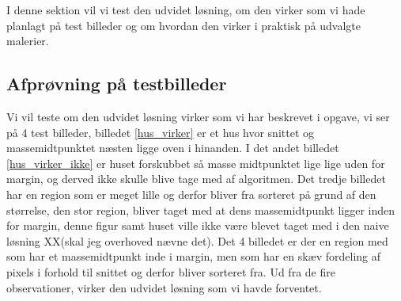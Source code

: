 I denne sektion vil vi test den udvidet løsning, om den virker som vi
hade planlagt på test billeder og om hvordan den virker i praktisk på
udvalgte malerier.

\subsection{Afprøvning på testbilleder}
Vi vil teste om den udvidet løsning virker som vi har beskrevet i
opgave, vi ser på 4 test billeder, billedet \ref{hus_virker} er et hus
hvor snittet og massemidtpunktet næsten ligge oven i hinanden. I det
andet billedet \ref{hus_virker_ikke} er huset forskubbet så masse
midtpunktet lige lige uden for margin, og derved ikke skulle blive tage
med af algoritmen. Det tredje billedet har en region som er meget lille
og derfor bliver fra sorteret på grund af den størrelse, den stor
region, bliver taget med at dens massemidtpunkt ligger inden for margin,
denne figur samt huset ville ikke være blevet taget med i den naive
løsning XX(skal jeg overhoved nævne det). Det 4 billedet er der en
region med som har et massemidtpunkt inde i margin, men som har en skæv
fordeling af pixels i forhold til snittet og derfor bliver sorteret fra.
Ud fra de fire observationer, virker den udvidet løsning som vi havde
forventet.


